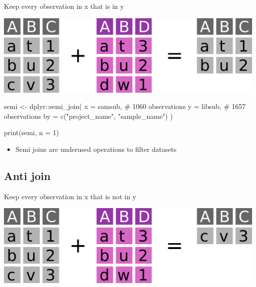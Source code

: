 \documentclass[
  letterpaper,
]{book}
\newenvironment{Shaded}{}{}
\newcommand{\AttributeTok}[1]{\textcolor[rgb]{0.84,0.23,0.29}{#1}}
\newcommand{\CommentTok}[1]{\textcolor[rgb]{0.42,0.45,0.49}{#1}}
\newcommand{\DecValTok}[1]{\textcolor[rgb]{0.00,0.36,0.77}{#1}}
\newcommand{\FunctionTok}[1]{\textcolor[rgb]{0.44,0.26,0.76}{#1}}
\newcommand{\NormalTok}[1]{\textcolor[rgb]{0.14,0.16,0.18}{#1}}
\newcommand{\OtherTok}[1]{\textcolor[rgb]{0.44,0.26,0.76}{#1}}
\newcommand{\SpecialCharTok}[1]{\textcolor[rgb]{0.00,0.36,0.77}{#1}}
\newcommand{\StringTok}[1]{\textcolor[rgb]{0.01,0.18,0.38}{#1}}
\providecommand{\tightlist}{%
  \setlength{\itemsep}{0pt}\setlength{\parskip}{0pt}}\usepackage{longtable,booktabs,array}
\begin{document}
Keep every observation in x that is in y

\includegraphics{assets/images/chapters/introduction-to-r/semi_join.png}

\begin{Shaded}
\begin{Highlighting}[]
\NormalTok{semi }\OtherTok{\textless{}{-}}\NormalTok{ dplyr}\SpecialCharTok{::}\FunctionTok{semi\_join}\NormalTok{(}
  \AttributeTok{x =}\NormalTok{ samsub,                           }\CommentTok{\# 1060 observations}
  \AttributeTok{y =}\NormalTok{ libsub,                           }\CommentTok{\# 1657 observations}
  \AttributeTok{by =} \FunctionTok{c}\NormalTok{(}\StringTok{"project\_name"}\NormalTok{, }\StringTok{"sample\_name"}\NormalTok{)}
\NormalTok{)}
\end{Highlighting}
\end{Shaded}

\begin{Shaded}
\begin{Highlighting}[]
\FunctionTok{print}\NormalTok{(semi, }\AttributeTok{n =} \DecValTok{1}\NormalTok{)}
\end{Highlighting}
\end{Shaded}

\begin{itemize}
\tightlist
\item
  Semi joins are underused operations to filter datasets
\end{itemize}

\hypertarget{anti-join}{%
\subsection{Anti join}\label{anti-join}}

Keep every observation in x that is not in y

\includegraphics{assets/images/chapters/introduction-to-r/anti_join.png}
\end{document}
